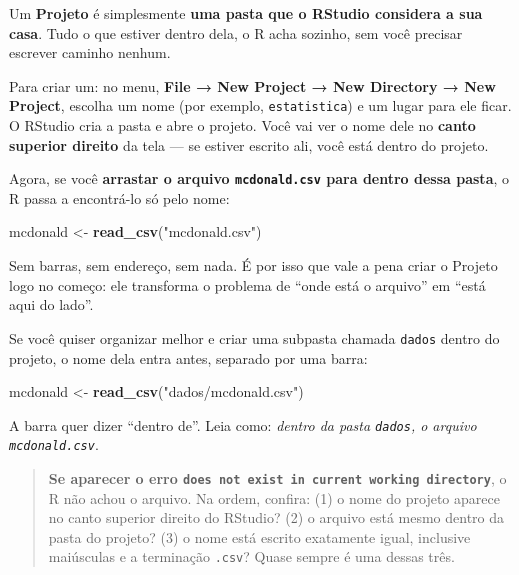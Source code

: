 \documentclass[
]{book}
\newenvironment{Shaded}{\begin{snugshade}}{\end{snugshade}}
\newcommand{\FunctionTok}[1]{\textcolor[rgb]{0.13,0.29,0.53}{\textbf{#1}}}
\newcommand{\NormalTok}[1]{#1}
\newcommand{\OtherTok}[1]{\textcolor[rgb]{0.56,0.35,0.01}{#1}}
\newcommand{\StringTok}[1]{\textcolor[rgb]{0.31,0.60,0.02}{#1}}
\begin{document}
Um \textbf{Projeto} é simplesmente \textbf{uma pasta que o RStudio considera a sua casa}. Tudo o que estiver dentro dela, o R acha sozinho, sem você precisar escrever caminho nenhum.

Para criar um: no menu, \textbf{File → New Project → New Directory → New Project}, escolha um nome (por exemplo, \texttt{estatistica}) e um lugar para ele ficar. O RStudio cria a pasta e abre o projeto. Você vai ver o nome dele no \textbf{canto superior direito} da tela --- se estiver escrito ali, você está dentro do projeto.

Agora, se você \textbf{arrastar o arquivo \texttt{mcdonald.csv} para dentro dessa pasta}, o R passa a encontrá-lo só pelo nome:

\begin{Shaded}
\begin{Highlighting}[]
\NormalTok{mcdonald }\OtherTok{\textless{}{-}} \FunctionTok{read\_csv}\NormalTok{(}\StringTok{"mcdonald.csv"}\NormalTok{)}
\end{Highlighting}
\end{Shaded}

Sem barras, sem endereço, sem nada. É por isso que vale a pena criar o Projeto logo no começo: ele transforma o problema de ``onde está o arquivo'' em ``está aqui do lado''.

Se você quiser organizar melhor e criar uma subpasta chamada \texttt{dados} dentro do projeto, o nome dela entra antes, separado por uma barra:

\begin{Shaded}
\begin{Highlighting}[]
\NormalTok{mcdonald }\OtherTok{\textless{}{-}} \FunctionTok{read\_csv}\NormalTok{(}\StringTok{"dados/mcdonald.csv"}\NormalTok{)}
\end{Highlighting}
\end{Shaded}

A barra quer dizer ``dentro de''. Leia como: \emph{dentro da pasta \texttt{dados}, o arquivo \texttt{mcdonald.csv}}.

\begin{quote}
\textbf{Se aparecer o erro \texttt{does\ not\ exist\ in\ current\ working\ directory}}, o R não achou o arquivo. Na ordem, confira: (1) o nome do projeto aparece no canto superior direito do RStudio? (2) o arquivo está mesmo dentro da pasta do projeto? (3) o nome está escrito exatamente igual, inclusive maiúsculas e a terminação \texttt{.csv}? Quase sempre é uma dessas três.
\end{quote}
\end{document}
